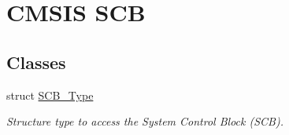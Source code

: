 \hypertarget{group___c_m_s_i_s___s_c_b}{\section{\-C\-M\-S\-I\-S \-S\-C\-B}
\label{group___c_m_s_i_s___s_c_b}
}
\subsection*{\-Classes}
\begin{DoxyCompactItemize}
\item 
struct \hyperlink{struct_s_c_b___type}{\-S\-C\-B\-\_\-\-Type}
\begin{DoxyCompactList}\small\item\em \-Structure type to access the \-System \-Control \-Block (\-S\-C\-B). \end{DoxyCompactList}\end{DoxyCompactItemize}
